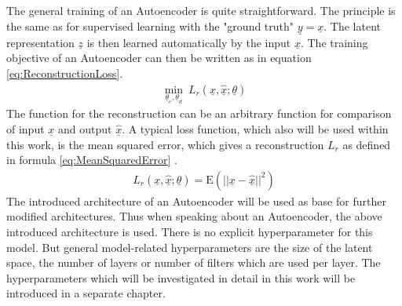 \documentclass[12pt,DIV14,BCOR12mm,a4paper,footexclude,headinclude,halfparskip-,twoside,openright,openany,cleardoubleempty,idxtotoc,bibtotoc]{scrreprt} %
\numberwithin{equation}{chapter}
\begin{document}
The general training of an Autoencoder is quite straightforward. The principle is the same as for supervised learning with the "ground truth" $\underline{y} = \underline{x}$. The latent representation $\underline{z}$ is then learned automatically by the input $\underline{x}$. The training objective of an Autoencoder can then be written as in equation \ref{eq:ReconstructionLoss}.
\begin{align}
	 \underset{\underline{\theta}_e,\underline{\theta}_d}\min\ L_r(\underline{x},\hat{\underline{x}};\underline{\theta})\label{eq:ReconstructionLoss}
\end{align}
The function for the reconstruction can be an arbitrary function for comparison of input $\underline{x}$ and output $\hat{\underline{x}}$. A typical loss function, which also will be used within this work, is the mean squared error, which gives a reconstruction $L_r$ as defined in formula \ref{eq:MeanSquaredError} \cite{LectureNotes_DeepLearning}.
\begin{align}
	 L_r(\underline{x},\hat{\underline{x}};\underline{\theta}) = \textrm{E}(||\underline{x}-\hat{\underline{x}}||^{2})\label{eq:MeanSquaredError}
\end{align}
The introduced architecture of an Autoencoder will be used as base for further modified architectures. Thus when speaking about an Autoencoder, the above introduced architecture is used. There is no explicit hyperparameter for this model. But general model-related hyperparameters are the size of the latent space, the number of layers or number of filters which are used per layer. The hyperparameters which will be investigated in detail in this work will be introduced in a separate chapter.
\end{document}
